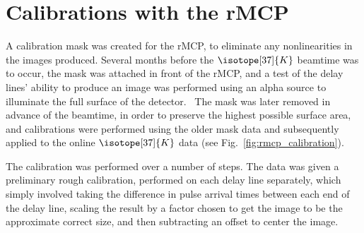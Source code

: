 
\section{Calibrations with the rMCP}
A calibration mask was created for the rMCP, to eliminate any nonlinearities in the images produced.  Several months before the $\isotope[37]{K}$ beamtime was to occur, the mask was attached in front of the rMCP, and a test of the delay lines' ability to produce an image was performed using an alpha source to illuminate the full surface of the detector.~  The mask was later removed in advance of the beamtime, in order to preserve the highest possible surface area, and calibrations were performed using the older mask data and subsequently applied to the online $\isotope[37]{K}$ data (see Fig.~\ref{fig:rmcp_calibration}).

The calibration was performed over a number of steps.  The data was given a preliminary rough calibration, performed on each delay line separately, which simply involved taking the difference in pulse arrival times between each end of the delay line, scaling the result by a factor chosen to get the image to be the approximate correct size, and then subtracting an offset to center the image.  

